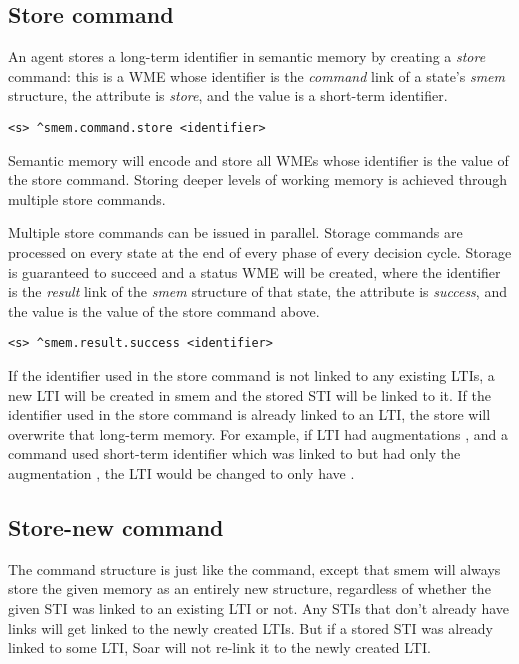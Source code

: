 \subsection{Store command}

An agent stores a long-term identifier in semantic memory by creating a \emph{store} command: this is a WME whose identifier is the \emph{command} link of a state's \emph{smem} structure, the attribute is \emph{store}, and the value is a short-term identifier.

\begin{verbatim}
<s> ^smem.command.store <identifier>
\end{verbatim}

Semantic memory will encode and store all WMEs whose identifier is the value of the store command.  
Storing deeper levels of working memory is achieved through multiple store commands.

Multiple store commands can be issued in parallel.  
Storage commands are processed on every state at the end of every phase of every decision cycle.  
Storage is guaranteed to succeed and a status WME will be created, where the identifier is the \emph{result} link of the \emph{smem} structure of that state, the attribute is \emph{success}, and the value is the value of the store command above.

\begin{verbatim}
<s> ^smem.result.success <identifier>
\end{verbatim}

If the identifier used in the store command is not linked to any existing LTIs, a new LTI will be created in smem and the stored STI will be linked to it. If the identifier used in the store command is already linked to an LTI, the store will overwrite that long-term memory.
For example, if LTI  had augmentations , and a  command used short-term identifier  which was linked to  but had only the augmentation , the LTI  would be changed to only have .

\subsection{Store-new command}

The  command structure is just like the  command, except that smem will always store the given memory as an entirely new structure, regardless of whether the given STI was linked to an existing LTI or not. Any STIs that don't already have links will get linked to the newly created LTIs. But if a stored STI was already linked to some LTI, Soar will not re-link it to the newly created LTI. 

